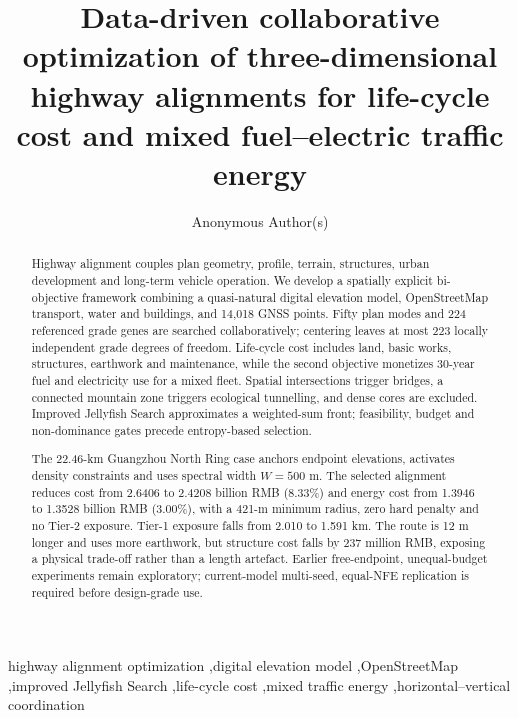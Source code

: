 \documentclass[preprint,12pt]{elsarticle}
\begin{document}
\begin{frontmatter}

\title{Data-driven collaborative optimization of three-dimensional highway alignments for life-cycle cost and mixed fuel--electric traffic energy}

\author[aff1]{Anonymous Author(s)}

\begin{abstract}
Highway alignment couples plan geometry, profile, terrain, structures, urban development and long-term vehicle operation. We develop a spatially explicit bi-objective framework combining a quasi-natural digital elevation model, OpenStreetMap transport, water and buildings, and 14,018 GNSS points. Fifty plan modes and 224 referenced grade genes are searched collaboratively; centering leaves at most 223 locally independent grade degrees of freedom. Life-cycle cost includes land, basic works, structures, earthwork and maintenance, while the second objective monetizes 30-year fuel and electricity use for a mixed fleet. Spatial intersections trigger bridges, a connected mountain zone triggers ecological tunnelling, and dense cores are excluded. Improved Jellyfish Search approximates a weighted-sum front; feasibility, budget and non-dominance gates precede entropy-based selection.

The 22.46-km Guangzhou North Ring case anchors endpoint elevations, activates density constraints and uses spectral width $W=500$ m. The selected alignment reduces cost from 2.6406 to 2.4208 billion RMB (8.33\%) and energy cost from 1.3946 to 1.3528 billion RMB (3.00\%), with a 421-m minimum radius, zero hard penalty and no Tier-2 exposure. Tier-1 exposure falls from 2.010 to 1.591 km. The route is 12 m longer and uses more earthwork, but structure cost falls by 237 million RMB, exposing a physical trade-off rather than a length artefact. Earlier free-endpoint, unequal-budget experiments remain exploratory; current-model multi-seed, equal-NFE replication is required before design-grade use.
\end{abstract}

\begin{keyword}
highway alignment optimization \sep digital elevation model \sep OpenStreetMap \sep improved Jellyfish Search \sep life-cycle cost \sep mixed traffic energy \sep horizontal--vertical coordination
\end{keyword}
\end{frontmatter}
\end{document}
